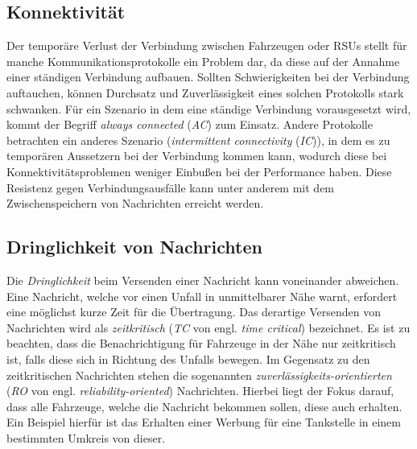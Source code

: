 \documentclass[english,runningheads,a4paper]{llncs}[2018/03/10]
\begin{document}
\subsection{Konnektivität}
Der temporäre Verlust der Verbindung zwischen Fahrzeugen oder RSUs stellt für manche Kommunikationsprotokolle ein Problem dar, da diese auf der Annahme einer ständigen Verbindung aufbauen.
Sollten Schwierigkeiten bei der Verbindung auftauchen, können Durchsatz und Zuverlässigkeit eines solchen Protokolls stark schwanken.
Für ein Szenario in dem eine ständige Verbindung vorausgesetzt wird, kommt der Begriff \textit{always connected} (\textit{AC}) zum Einsatz.
Andere Protokolle betrachten ein anderes Szenario (\textit{intermittent connectivity} (\textit{IC})), in dem es zu temporären Aussetzern bei der Verbindung kommen kann, wodurch diese bei Konnektivitätsproblemen weniger Einbußen bei der Performance haben.
Diese Resistenz gegen Verbindungsausfälle kann unter anderem mit dem Zwischenspeichern von Nachrichten erreicht werden.


\subsection{Dringlichkeit von Nachrichten}
Die \textit{Dringlichkeit} beim Versenden einer Nachricht kann voneinander abweichen.
Eine Nachricht, welche vor einen Unfall in unmittelbarer Nähe warnt, erfordert eine möglichst kurze Zeit für die Übertragung.
Das derartige Versenden von Nachrichten wird als \textit{zeitkritisch} (\textit{TC} von engl. \textit{time critical}) bezeichnet.
Es ist zu beachten, dass die Benachrichtigung für Fahrzeuge in der Nähe nur zeitkritisch ist, falls diese sich in Richtung des Unfalls bewegen.
Im Gegensatz zu den zeitkritischen Nachrichten stehen die sogenannten \textit{zuverlässigkeits-orientierten} (\textit{RO} von engl. \textit{reliability-oriented}) Nachrichten.
Hierbei liegt der Fokus darauf, dass alle Fahrzeuge, welche die Nachricht bekommen sollen, diese auch erhalten.
Ein Beispiel hierfür ist das Erhalten einer Werbung für eine Tankstelle in einem bestimmten Umkreis von dieser.
\end{document}
